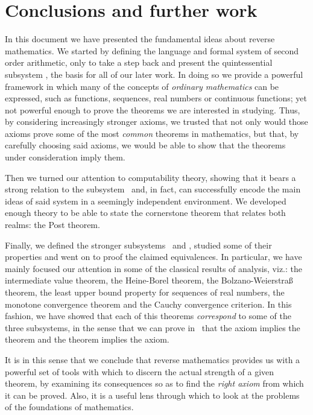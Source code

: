 \documentclass[../main.tex]{memoir}
\begin{document}
\chapter{Conclusions and further work}

In this document we have presented the fundamental ideas about reverse mathematics. We started by defining the language and formal system of second order arithmetic, only to take a step back and present the quintessential subsystem \rca, the basis for all of our later work. In doing so we provide a powerful framework in which many of the concepts of \textit{ordinary mathematics} can be expressed, such as functions, sequences, real numbers or continuous functions; yet not powerful enough to prove the theorems we are interested in studying. Thus, by considering increasingly stronger axioms, we trusted that not only would those axioms prove some of the most \textit{common} theorems in mathematics, but that, by carefully choosing said axioms, we would be able to show that the theorems under consideration imply them.

Then we turned our attention to computability theory, showing that it bears a strong relation to the subsystem \rca\ and, in fact, can successfully encode the main ideas of said system in a seemingly independent environment. We developed enough theory to be able to state the cornerstone theorem that relates both realms: the Post theorem.

Finally, we defined the stronger subsystems \wkl\ and \aca, studied some of their properties and went on to proof the claimed equivalences. In particular, we have mainly focused our attention in some of the classical results of analysis, viz.: the intermediate value theorem, the Heine-Borel theorem, the Bolzano-Weierstra{\ss} theorem, the least upper bound property for sequences of real numbers, the monotone convergence theorem and the Cauchy convergence criterion. In this fashion, we have showed that each of this theorems \textit{correspond} to some of the three subsystems, in the sense that we can prove in \rca\ that the axiom implies the theorem and the theorem implies the axiom.

It is in this sense that we conclude that reverse mathematics provides us with a powerful set of tools with which to discern the actual strength of a given theorem, by examining its consequences so as to find the \textit{right axiom} from which it can be proved. Also, it is a useful lens through which to look at the problems of the foundations of mathematics.
\end{document}
